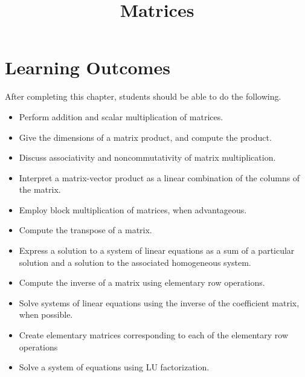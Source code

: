 \documentclass{ximera}
\title{Matrices}
\begin{document}
\begin{abstract}

\end{abstract}
 
\maketitle
 
\section*{Learning Outcomes}
After completing this chapter, students should be able to do the following.
 
\begin{itemize}
    \item Perform addition and scalar multiplication of matrices.
    \item Give the dimensions of a matrix product, and compute the product.
    \item Discuss associativity and noncommutativity of matrix multiplication.
    \item  Interpret a matrix-vector product as a linear combination of the columns of the matrix.
    \item Employ block multiplication of matrices, when advantageous.
    \item Compute the transpose of a matrix.
    \item Express a solution to a system of linear equations as a sum of a particular solution and a solution to the associated homogeneous system.
    \item Compute the inverse of a matrix using elementary row operations.
    \item  Solve systems of linear equations using the inverse of the coefficient matrix, when possible.
    \item Create elementary matrices corresponding to each of the elementary row operations    
    \item Solve a system of equations using LU factorization.

 
\end{itemize}

 
\end{document}
